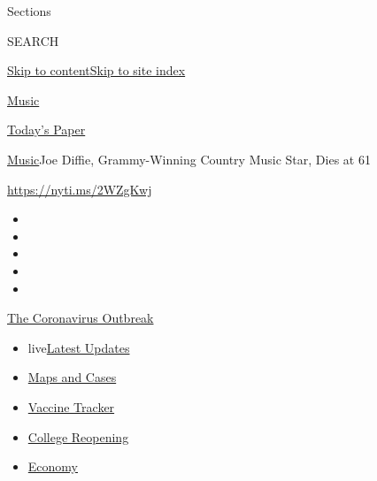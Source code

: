 Sections

SEARCH

\protect\hyperlink{site-content}{Skip to
content}\protect\hyperlink{site-index}{Skip to site index}

\href{https://www.nytimes3xbfgragh.onion/section/arts/music}{Music}

\href{https://myaccount.nytimes3xbfgragh.onion/auth/login?response_type=cookie\&client_id=vi}{}

\href{https://www.nytimes3xbfgragh.onion/section/todayspaper}{Today's
Paper}

\href{/section/arts/music}{Music}\textbar{}Joe Diffie, Grammy-Winning
Country Music Star, Dies at 61

\url{https://nyti.ms/2WZgKwj}

\begin{itemize}
\item
\item
\item
\item
\item
\end{itemize}

\href{https://www.nytimes3xbfgragh.onion/news-event/coronavirus?action=click\&pgtype=Article\&state=default\&region=TOP_BANNER\&context=storylines_menu}{The
Coronavirus Outbreak}

\begin{itemize}
\tightlist
\item
  live\href{https://www.nytimes3xbfgragh.onion/2020/08/04/world/coronavirus-covid-19.html?action=click\&pgtype=Article\&state=default\&region=TOP_BANNER\&context=storylines_menu}{Latest
  Updates}
\item
  \href{https://www.nytimes3xbfgragh.onion/interactive/2020/us/coronavirus-us-cases.html?action=click\&pgtype=Article\&state=default\&region=TOP_BANNER\&context=storylines_menu}{Maps
  and Cases}
\item
  \href{https://www.nytimes3xbfgragh.onion/interactive/2020/science/coronavirus-vaccine-tracker.html?action=click\&pgtype=Article\&state=default\&region=TOP_BANNER\&context=storylines_menu}{Vaccine
  Tracker}
\item
  \href{https://www.nytimes3xbfgragh.onion/2020/08/02/us/covid-college-reopening.html?action=click\&pgtype=Article\&state=default\&region=TOP_BANNER\&context=storylines_menu}{College
  Reopening}
\item
  \href{https://www.nytimes3xbfgragh.onion/live/2020/08/03/business/stock-market-today-coronavirus?action=click\&pgtype=Article\&state=default\&region=TOP_BANNER\&context=storylines_menu}{Economy}
\end{itemize}

